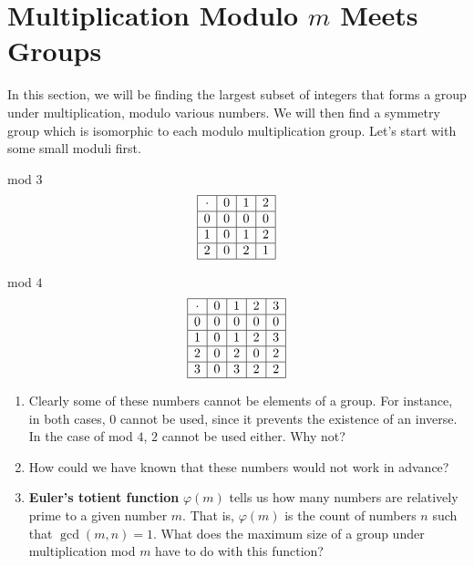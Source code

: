 \documentclass[../gatm.tex]{subfiles}
\begin{document}
\section{Multiplication Modulo $m$ Meets Groups}
\setcounter{problem_i}{0}

In this section, we will be finding the largest subset of integers that forms a group under multiplication, modulo various numbers. We will then find a symmetry group which is isomorphic to each modulo multiplication group. Let's start with some small moduli first.

\begin{minipage}{0.5\textwidth}
\centering
mod $3$
$$\begin{array}{|c|c|c|c|}
\hline
\cdot & 0 & 1 & 2 \\ \hline
0 & 0 & 0 & 0 \\ \hline
1 & 0 & 1 & 2 \\ \hline
2 & 0 & 2 & 1 \\ \hline
\end{array}$$
\end{minipage}\hfill
\begin{minipage}{0.5\textwidth}
\centering
mod $4$
$$\begin{array}{|c|c|c|c|c|}
\hline
\cdot & 0 & 1 & 2 & 3 \\ \hline
0 & 0 & 0 & 0 & 0 \\ \hline
1 & 0 & 1 & 2 & 3 \\ \hline
2 & 0 & 2 & 0 & 2 \\ \hline
3 & 0 & 3 & 2 & 2 \\ \hline
\end{array}$$
\end{minipage}

\begin{enumerate}
\item Clearly some of these numbers cannot be elements of a group. For instance, in both cases, $0$ cannot be used, since it prevents the existence of an inverse. In the case of mod $4$, $2$ cannot be used either. Why not?
\item How could we have known that these numbers would not work in advance?
\item \textbf{Euler's totient function} $\varphi(m)$ tells us how many numbers are relatively prime to a given number $m$. That is, $\varphi(m)$ is the count of numbers $n$ such that $\gcd(m,n)=1$. What does the maximum size of a group under multiplication mod $m$ have to do with this function?
\setcounter{problem_i}{\value{enumi}}
\end{enumerate}
\end{document}
